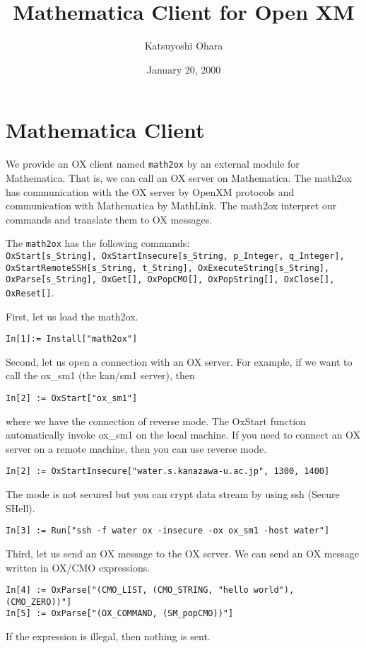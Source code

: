 \documentclass{article}
\title{Mathematica Client for Open XM}
\date{January 20, 2000}
\author{Katsuyoshi Ohara}
\begin{document}
\maketitle

\section{Mathematica Client}

We provide an OX client named {\tt math2ox} by an external module for
Mathematica. That is, we can call an OX server on Mathematica.  The
math2ox has communication with the OX server by OpenXM protocols and
communication with Mathematica by MathLink.  The math2ox interpret our
commands and translate them to OX messages.

The {\tt math2ox} has the following commands:\\
{\tt OxStart[s\_String], 
OxStartInsecure[s\_String, p\_Integer, q\_Integer],
OxStartRemoteSSH[s\_String, t\_String], 
OxExecuteString[s\_String], OxParse[s\_String], OxGet[], OxPopCMO[],
OxPopString[], OxClose[], OxReset[]}.

First, let us load the math2ox.
\begin{verbatim}
In[1]:= Install["math2ox"]
\end{verbatim}

Second, let us open a connection with an OX server.
For example, if we want to call the ox\_sm1 (the kan/sm1 server), then
\begin{verbatim}
In[2] := OxStart["ox_sm1"]
\end{verbatim}
where we have the connection of reverse mode.  The OxStart function
automatically invoke ox\_sm1 on the local machine.  If you need to
connect an OX server on a remote machine, then you can use reverse mode.
\begin{verbatim}
In[2] := OxStartInsecure["water.s.kanazawa-u.ac.jp", 1300, 1400]
\end{verbatim}
The mode is not secured but you can crypt data stream by using ssh
(Secure SHell).
\begin{verbatim}
In[3] := Run["ssh -f water ox -insecure -ox ox_sm1 -host water"]
\end{verbatim}

Third, let us send an OX message to the OX server.
We can send an OX message written in OX/CMO expressions.
\begin{verbatim}
In[4] := OxParse["(CMO_LIST, (CMO_STRING, "hello world"), (CMO_ZERO))"]
In[5] := OxParse["(OX_COMMAND, (SM_popCMO))"]
\end{verbatim}
If the expression is illegal, then nothing is sent.
\end{document}
